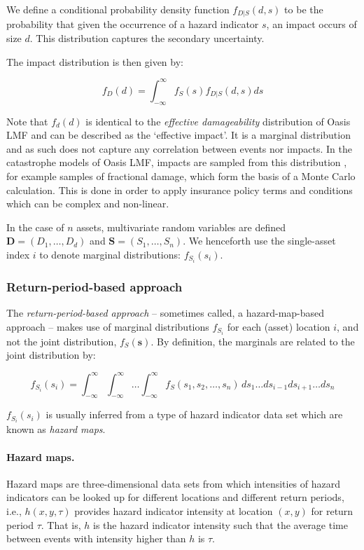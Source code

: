 \documentclass[a4paper,11pt]{extarticle} %
\theoremstyle{definition}
\begin{document}
We define a conditional probability density function $f_{D|S}(d, s)$ to be the probability that given the occurrence of a hazard indicator $s$, an impact occurs of size $d$. This distribution captures the secondary uncertainty.

The impact distribution is then given by:

  \begin{equation}
     \label{Eq:ImpactEffective}
     f_D(d) = \int_{-\infty}^{\infty} f_S(s) f_{D|S}(d, s) ds
 \end{equation}

Note that $f_d(d)$ is identical to the {\it effective damageability} distribution of Oasis LMF\cite{OasisFinancialModule} and can be described as the `effective impact'. It is a marginal distribution and as such does not capture any correlation between events nor impacts. In the catastrophe models of Oasis LMF, impacts are sampled from this distribution \cite{OasisFinancialModule}, for example samples of fractional damage, which form the basis of a Monte Carlo calculation. This is done in order to apply insurance policy terms and conditions which can be complex and non-linear.

In the case of $n$ assets, multivariate random variables are defined $\mathbf{D} = (D_1,\ldots,D_d)$ and $\mathbf{S} = (S_1,\ldots,S_n)$. We henceforth use the single-asset index $i$ to denote marginal distributions: $f_{S_i}(s_i)$.

\subsubsection{Return-period-based approach}

The \emph{return-period-based approach} -- sometimes called, a hazard-map-based approach -- makes use of marginal distributions $f_{S_i}$ for each (asset) location $i$, and not the joint distribution, $f_S(\mathbf{s})$. By definition, the marginals are related to the joint distribution by:

 \begin{equation}
    \label{Eq:ImpactMarginal}
    f_{S_i}(s_i) = \int_{-\infty}^{\infty} \int_{-\infty}^{\infty} \dots \int_{-\infty}^{\infty} f_S(s_1,s_2, \dots,s_n) \,ds_1 \dots ds_{i-1} ds_{i + 1} \dots ds_n
\end{equation}

$f_{S_i}(s_i)$ is usually inferred from a type of hazard indicator data set which are known as \emph{hazard maps}.

\paragraph{Hazard maps.} Hazard maps are three-dimensional data sets from which intensities of hazard indicators can be looked up for different locations and different return periods, i.e., $h(x, y, \tau)$ provides hazard indicator intensity at location $(x, y)$ for return period $\tau$. That is, $h$ is the hazard indicator intensity such that the average time between events with intensity higher than $h$ is $\tau$.
\end{document}
